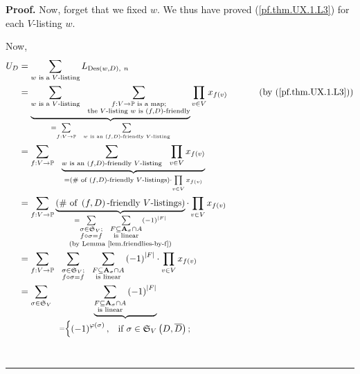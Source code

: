 \documentclass[numbers=enddot,12pt,final,onecolumn,notitlepage]{scrartcl}%
\numberwithin{exer}{section}
\theoremstyle{definition}
\newenvironment{proof}[1][Proof]{\noindent\textbf{#1.} }{\ \rule{0.5em}{0.5em}}
\let\sumnonlimits\sum
\let\prodnonlimits\prod
\renewcommand{\sum}{\sumnonlimits\limits}
\renewcommand{\prod}{\prodnonlimits\limits}
\newenvironment{vershort}{}{}
\begin{document}
\begin{proof}
Now, forget that we fixed $w$. We thus have proved (\ref{pf.thm.UX.1.L3}) for
each $V$-listing $w$.

\begin{vershort}
Now,
\begin{align*}
U_{D}  &  =\sum_{w\text{ is a }V\text{-listing}}L_{\operatorname*{Des}\left(
w,D\right)  ,\ n}\\
&  =\underbrace{\sum_{w\text{ is a }V\text{-listing}}\ \ \sum
_{\substack{f:V\rightarrow\mathbb{P}\text{ is a map};\\\text{the
}V\text{-listing }w\text{ is }\left(  f,D\right)  \text{-friendly}}}}%
_{=\sum_{f:V\rightarrow\mathbb{P}}\ \ \sum_{w\text{ is an }\left(  f,D\right)
\text{-friendly }V\text{-listing}}}\prod_{v\in V}x_{f\left(  v\right)
}\ \ \ \ \ \ \ \ \ \ \left(  \text{by (\ref{pf.thm.UX.1.L3})}\right) \\
&  =\sum_{f:V\rightarrow\mathbb{P}}\ \ \underbrace{\sum_{w\text{ is an
}\left(  f,D\right)  \text{-friendly }V\text{-listing}}\ \ \prod_{v\in
V}x_{f\left(  v\right)  }}_{=\left(  \text{\# of }\left(  f,D\right)
\text{-friendly }V\text{-listings}\right)  \cdot\prod_{v\in V}x_{f\left(
v\right)  }}\\
&  =\sum_{f:V\rightarrow\mathbb{P}}\underbrace{\left(  \text{\# of }\left(
f,D\right)  \text{-friendly }V\text{-listings}\right)  }_{\substack{=\sum
_{\substack{\sigma\in\mathfrak{S}_{V};\\f\circ\sigma=f}}\ \ \sum
_{\substack{F\subseteq\mathbf{A}_{\sigma}\cap A\\\text{is linear}}}\left(
-1\right)  ^{\left\vert F\right\vert }\\\text{(by Lemma
\ref{lem.friendlies-by-f})}}}\cdot\prod_{v\in V}x_{f\left(  v\right)  }\\
&  =\sum_{f:V\rightarrow\mathbb{P}}\ \ \sum_{\substack{\sigma\in
\mathfrak{S}_{V};\\f\circ\sigma=f}}\ \ \sum_{\substack{F\subseteq
\mathbf{A}_{\sigma}\cap A\\\text{is linear}}}\left(  -1\right)  ^{\left\vert
F\right\vert }\cdot\prod_{v\in V}x_{f\left(  v\right)  }\\
&  =\sum_{\sigma\in\mathfrak{S}_{V}}\ \ \underbrace{\sum_{\substack{F\subseteq
\mathbf{A}_{\sigma}\cap A\\\text{is linear}}}\left(  -1\right)  ^{\left\vert
F\right\vert }}_{\substack{=%
\begin{cases}
\left(  -1\right)  ^{\varphi\left(  \sigma\right)  }, & \text{if }\sigma
\in\mathfrak{S}_{V}\left(  D,\overline{D}\right)  ;\\

\end{cases}}}
\end{align*}
\end{vershort}
\end{proof}
\end{document}
